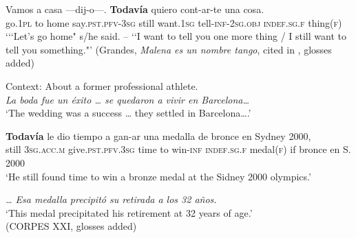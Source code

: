 \begin{exe}
	
	\ex\label{exAppendixSpanishTodaviaAdditive6}	
	\gll Vamos a casa —dij-o—. \textbf{Todavía} quiero cont-ar-te una cosa.\\
	go.1\textsc{pl} to home \phantom{–}say.\textsc{pst}.\textsc{pfv}-3\textsc{sg} still want.1\textsc{sg} tell-\textsc{inf}-2\textsc{sg}.\textsc{obj} \textsc{indef}.\textsc{sg}.\textsc{f} thing(\textsc{f})\\
	\glt \lq {\lq\lq}Let’s go home" s/he said. -- \lq\lq I want to tell you one more thing / I still want to tell you something."' (Grandes, \textit{Malena es un nombre tango}, cited in \cite[§30.8k]{RAEGramatica}, glosses added)
	
		\ex\label{exAppendixSpanishTodaviaAdditive7}
		Context: About a former professional athlete.\\
	\textit{La boda fue un éxito …  se quedaron a vivir en Barcelona…}\\
	\lq The wedding was a success … they settled in Barcelona….\rq{}

	\exi{}\gll \textbf{Todavía} le dio tiempo a gan-ar una medalla de bronce en Sydney 2000,\\
	still 3\textsc{sg}.\textsc{acc}.\textsc{m} give.\textsc{pst}.\textsc{pfv}.3\textsc{sg} time to win-\textsc{inf} \textsc{indef}.\textsc{sg}.\textsc{f} medal(\textsc{f}) if bronce en S. 2000\\
	 \glt \lq He still found time to win a bronze medal at the Sidney 2000 olympics.\rq{}
	 
	\exi{} \textit{… Esa medalla precipitó su retirada a los 32 años.}\\
	 \lq This medal precipitated his retirement at 32 years of age.\rq{}
	 \\(CORPES XXI, glosses added)
\end{exe}


